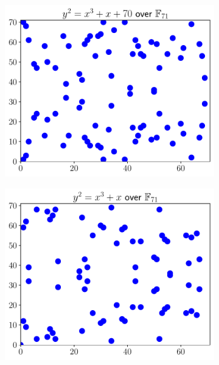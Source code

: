 \begin{figure}[p]
    \begin{subfigure}[t]{0.45\textwidth}
    \includegraphics[width=\textwidth]{plots/ec_finite/ec_finite_F_71_1_70.pdf}
    \end{subfigure}
    \begin{subfigure}[t]{0.45\textwidth}
    \includegraphics[width=\textwidth]{plots/ec_finite/ec_finite_F_71_1_0.pdf}
    \end{subfigure}


\end{figure}
